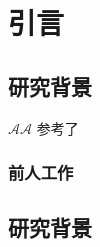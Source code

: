 \chapter{引言}

\section{研究背景}
$\mathcal{A} \mathscr{A}$ 
参考了 \parencite{曾谨言2013量子力学} \parencite{feynman2011feynman} \parencite{zurek2014quantum}
\parencite{wikimedia:stern-gerlach-experiment, zettili2003quantum}
\subsection{前人工作}

\section{研究背景}
